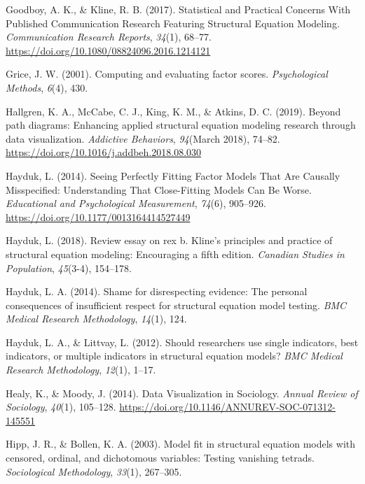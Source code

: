\documentclass[
  english,
  doc]{apa6}
\newlength{\cslhangindent}
\newenvironment{cslreferences}%
  {\setlength{\parindent}{0pt}%
  \everypar{\setlength{\hangindent}{\cslhangindent}}\ignorespaces}%
  {\par}
\begin{document}
\begin{cslreferences}
\leavevmode\hypertarget{ref-Goodboy2017}{}%
Goodboy, A. K., \& Kline, R. B. (2017). Statistical and Practical Concerns With Published Communication Research Featuring Structural Equation Modeling. \emph{Communication Research Reports}, \emph{34}(1), 68--77. \url{https://doi.org/10.1080/08824096.2016.1214121}

\leavevmode\hypertarget{ref-grice2001computing}{}%
Grice, J. W. (2001). Computing and evaluating factor scores. \emph{Psychological Methods}, \emph{6}(4), 430.

\leavevmode\hypertarget{ref-Hallgren2019a}{}%
Hallgren, K. A., McCabe, C. J., King, K. M., \& Atkins, D. C. (2019). Beyond path diagrams: Enhancing applied structural equation modeling research through data visualization. \emph{Addictive Behaviors}, \emph{94}(March 2018), 74--82. \url{https://doi.org/10.1016/j.addbeh.2018.08.030}

\leavevmode\hypertarget{ref-Hayduk2014}{}%
Hayduk, L. (2014). Seeing Perfectly Fitting Factor Models That Are Causally Misspecified: Understanding That Close-Fitting Models Can Be Worse. \emph{Educational and Psychological Measurement}, \emph{74}(6), 905--926. \url{https://doi.org/10.1177/0013164414527449}

\leavevmode\hypertarget{ref-hayduk2018review}{}%
Hayduk, L. (2018). Review essay on rex b. Kline's principles and practice of structural equation modeling: Encouraging a fifth edition. \emph{Canadian Studies in Population}, \emph{45}(3-4), 154--178.

\leavevmode\hypertarget{ref-hayduk2014shame}{}%
Hayduk, L. A. (2014). Shame for disrespecting evidence: The personal consequences of insufficient respect for structural equation model testing. \emph{BMC Medical Research Methodology}, \emph{14}(1), 124.

\leavevmode\hypertarget{ref-hayduk2012should}{}%
Hayduk, L. A., \& Littvay, L. (2012). Should researchers use single indicators, best indicators, or multiple indicators in structural equation models? \emph{BMC Medical Research Methodology}, \emph{12}(1), 1--17.

\leavevmode\hypertarget{ref-Healy2014a}{}%
Healy, K., \& Moody, J. (2014). Data Visualization in Sociology. \emph{Annual Review of Sociology}, \emph{40}(1), 105--128. \url{https://doi.org/10.1146/ANNUREV-SOC-071312-145551}

\leavevmode\hypertarget{ref-hipp2003model}{}%
Hipp, J. R., \& Bollen, K. A. (2003). Model fit in structural equation models with censored, ordinal, and dichotomous variables: Testing vanishing tetrads. \emph{Sociological Methodology}, \emph{33}(1), 267--305.


\end{cslreferences}
\end{document}
